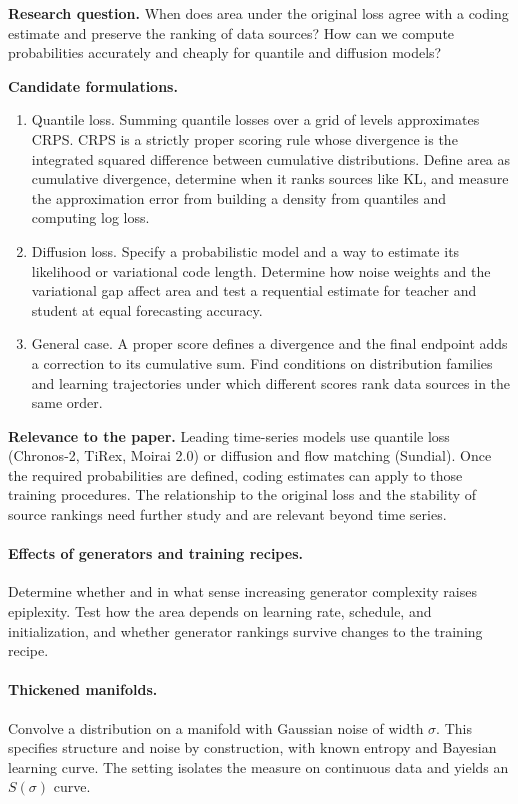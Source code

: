 \documentclass[11pt]{article}
\begin{document}
\begin{framed}
\noindent\textbf{Research question.} When does area under the original loss
agree with a coding estimate and preserve the ranking of data sources?
How can we compute probabilities accurately and cheaply for quantile and
diffusion models?

\medskip\noindent\textbf{Candidate formulations.}
\begin{enumerate}[nosep,leftmargin=1.4em]
\item Quantile loss. Summing quantile losses over a grid of levels approximates
  CRPS. CRPS is a strictly proper scoring rule whose divergence is the
  integrated squared difference between cumulative distributions. Define area
  as cumulative divergence, determine when it ranks sources like KL, and
  measure the approximation error from building a density from quantiles
  and computing log loss.
\item Diffusion loss. Specify a probabilistic model and a way to estimate its
  likelihood or variational code length. Determine how noise weights and the
  variational gap affect area and test a requential estimate for teacher and
  student at equal forecasting accuracy.
\item General case. A proper score defines a divergence and the final endpoint
  adds a correction to its cumulative sum. Find conditions on distribution
  families and learning trajectories under which different scores rank
  data sources in the same order.
\end{enumerate}

\medskip\noindent\textbf{Relevance to the paper.} Leading time-series models use
quantile loss (Chronos-2, TiRex, Moirai 2.0) or diffusion and flow matching
(Sundial). Once the required probabilities are defined, coding estimates
can apply to those training procedures. The relationship to the original
loss and the stability of source rankings need further study and are
relevant beyond time series.
\end{framed}

\paragraph{Effects of generators and training recipes.} Determine whether
and in what sense increasing generator complexity raises epiplexity.
Test how the area depends on learning rate, schedule, and initialization,
and whether generator rankings survive changes to the training recipe.

\paragraph{Thickened manifolds.} Convolve a distribution on a manifold
with Gaussian noise of width $\sigma$. This specifies structure and noise
by construction, with known entropy and Bayesian learning curve. The
setting isolates the measure on continuous data and yields an $S(\sigma)$ curve.



\end{document}
